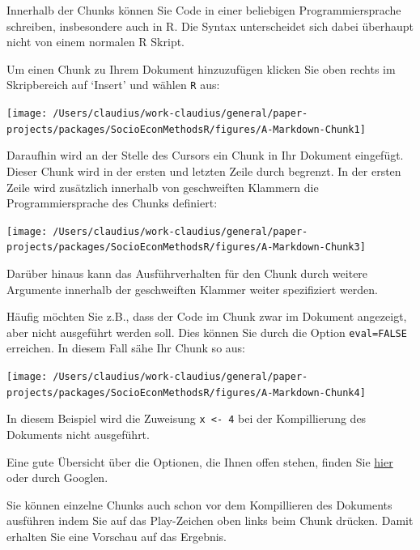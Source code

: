 \documentclass[]{tufte-book}
\begin{document}
Innerhalb der Chunks können Sie Code in einer beliebigen
Programmiersprache schreiben, insbesondere auch in R. Die Syntax
unterscheidet sich dabei überhaupt nicht von einem normalen R Skript.

Um einen Chunk zu Ihrem Dokument hinzuzufügen klicken Sie oben rechts im
Skripbereich auf `Insert' und wählen \texttt{R} aus:

\begin{center}\texttt{[image: /Users/claudius/work-claudius/general/paper-projects/packages/SocioEconMethodsR/figures/A-Markdown-Chunk1]} \end{center}

Daraufhin wird an der Stelle des Cursors ein Chunk in Ihr Dokument
eingefügt. Dieser Chunk wird in der ersten und letzten Zeile durch
\texttt{\textasciigrave{}\textasciigrave{}\textasciigrave{}} begrenzt.
In der ersten Zeile wird zusätzlich innerhalb von geschweiften Klammern
die Programmiersprache des Chunks definiert:

\begin{center}\texttt{[image: /Users/claudius/work-claudius/general/paper-projects/packages/SocioEconMethodsR/figures/A-Markdown-Chunk3]} \end{center}

Darüber hinaus kann das Ausführverhalten für den Chunk durch weitere
Argumente innerhalb der geschweiften Klammer weiter spezifiziert werden.

Häufig möchten Sie z.B., dass der Code im Chunk zwar im Dokument
angezeigt, aber nicht ausgeführt werden soll. Dies können Sie durch die
Option \texttt{eval=FALSE} erreichen. In diesem Fall sähe Ihr Chunk so
aus:

\begin{center}\texttt{[image: /Users/claudius/work-claudius/general/paper-projects/packages/SocioEconMethodsR/figures/A-Markdown-Chunk4]} \end{center}

In diesem Beispiel wird die Zuweisung \texttt{x\ \textless{}-\ 4} bei
der Kompillierung des Dokuments nicht ausgeführt.

Eine gute Übersicht über die Optionen, die Ihnen offen stehen, finden
Sie
\href{https://rstudio.com/wp-content/uploads/2015/03/rmarkdown-reference.pdf}{hier}
oder durch Googlen.

Sie können einzelne Chunks auch schon vor dem Kompillieren des Dokuments
ausführen indem Sie auf das Play-Zeichen oben links beim Chunk drücken.
Damit erhalten Sie eine Vorschau auf das Ergebnis.
\end{document}
